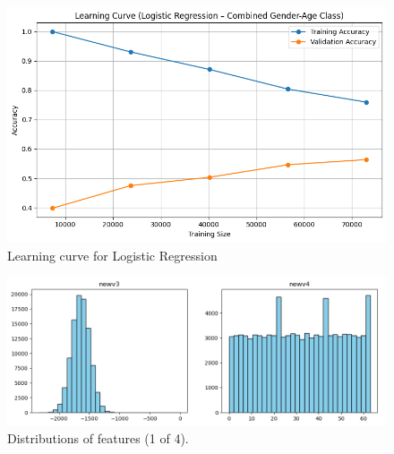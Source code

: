 \documentclass[10pt,twocolumn]{article}
\begin{document}
\begin{figure}[H]
    \centering
    \includegraphics[width=1\linewidth]{images/lr/cross-validation - normal.png}
    \caption{Learning curve for Logistic Regression}
    \label{fig:reduced-learning-curve}
\end{figure}

\begin{figure}[H]
    \centering
    \includegraphics[width=0.85\linewidth]{images/distribution_3.png}
    \caption{Distributions of features (1 of 4).}
    \label{fig:distribution-3}
\end{figure}
\end{document}
